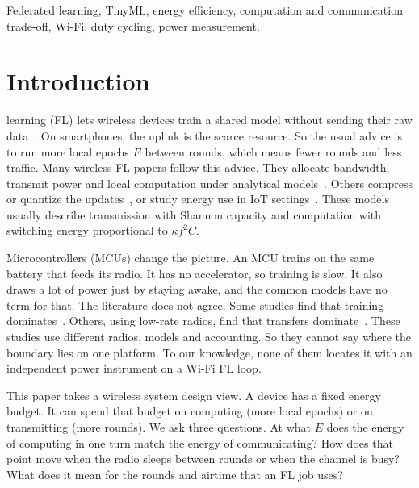 \documentclass[journal]{IEEEtran}
\begin{document}
\begin{IEEEkeywords}
Federated learning, TinyML, energy efficiency, computation and communication trade-off, Wi-Fi, duty cycling, power measurement.
\end{IEEEkeywords}

\section{Introduction}
 learning (FL) lets wireless devices train a shared model without sending their raw data~\cite{mcmahan2017communication}. On smartphones, the uplink is the scarce resource. So the usual advice is to run more local epochs $E$ between rounds, which means fewer rounds and less traffic. Many wireless FL papers follow this advice. They allocate bandwidth, transmit power and local computation under analytical models~\cite{zhou2022joint,chen2022federated,zhao2023energy,pham2022energy,ren2022toward,fan2024uavenabled,ju2024befl}. Others compress or quantize the updates~\cite{pan2025rfcsc,xiao2026communication,wang2022communication,paragliola2022evaluation}, or study energy use in IoT settings~\cite{tekin2023energy,sabovic2025energy}. These models usually describe transmission with Shannon capacity and computation with switching energy proportional to $\kappa f^2 C$.

Microcontrollers (MCUs) change the picture. An MCU trains on the same battery that feeds its radio. It has no accelerator, so training is slow. It also draws a lot of power just by staying awake, and the common models have no term for that. The literature does not agree. Some studies find that training dominates~\cite{ficco2024federated,rupaak2026quantifying}. Others, using low-rate radios, find that transfers dominate~\cite{gimenez2023embedded,sanchez2025enhancing,singh2025federated}. These studies use different radios, models and accounting. So they cannot say where the boundary lies on one platform. To our knowledge, none of them locates it with an independent power instrument on a Wi-Fi FL loop.

This paper takes a wireless system design view. A device has a fixed energy budget. It can spend that budget on computing (more local epochs) or on transmitting (more rounds). We ask three questions. At what $E$ does the energy of computing in one turn match the energy of communicating? How does that point move when the radio sleeps between rounds or when the channel is busy? What does it mean for the rounds and airtime that an FL job uses?
\end{document}
